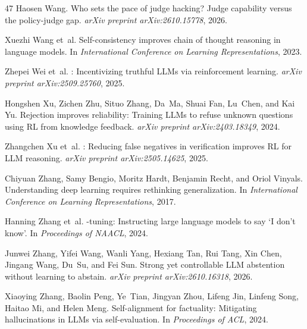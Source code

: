 \documentclass[11pt,a4paper,twocolumn]{article}
\begin{document}
\begin{thebibliography}{47}
Haosen Wang.
\newblock Who sets the pace of judge hacking? {J}udge capability versus the
  policy-judge gap.
\newblock \emph{arXiv preprint arXiv:2610.15778}, 2026.

Xuezhi Wang et~al.
\newblock Self-consistency improves chain of thought reasoning in language
  models.
\newblock In \emph{International Conference on Learning Representations}, 2023.

Zhepei Wei et~al.
: Incentivizing truthful {LLMs} via reinforcement learning.
\newblock \emph{arXiv preprint arXiv:2509.25760}, 2025.

Hongshen Xu, Zichen Zhu, Situo Zhang, Da~Ma, Shuai Fan, Lu~Chen, and Kai Yu.
\newblock Rejection improves reliability: Training {LLMs} to refuse unknown
  questions using {RL} from knowledge feedback.
\newblock \emph{arXiv preprint arXiv:2403.18349}, 2024.

Zhangchen Xu et~al.
: Reducing false negatives in verification improves {RL} for
  {LLM} reasoning.
\newblock \emph{arXiv preprint arXiv:2505.14625}, 2025.

Chiyuan Zhang, Samy Bengio, Moritz Hardt, Benjamin Recht, and Oriol Vinyals.
\newblock Understanding deep learning requires rethinking generalization.
\newblock In \emph{International Conference on Learning Representations}, 2017.

Hanning Zhang et~al.
-tuning: Instructing large language models to say `{I} don't
  know'.
\newblock In \emph{Proceedings of NAACL}, 2024{}.

Junwei Zhang, Yifei Wang, Wanli Yang, Hexiang Tan, Rui Tang, Xin Chen, Jingang
  Wang, Du~Su, and Fei Sun.
\newblock Strong yet controllable {LLM} abstention without learning to abstain.
\newblock \emph{arXiv preprint arXiv:2610.16318}, 2026.

Xiaoying Zhang, Baolin Peng, Ye~Tian, Jingyan Zhou, Lifeng Jin, Linfeng Song,
  Haitao Mi, and Helen Meng.
\newblock Self-alignment for factuality: Mitigating hallucinations in {LLM}s
  via self-evaluation.
\newblock In \emph{Proceedings of ACL}, 2024{}.


\end{thebibliography}
\end{document}
